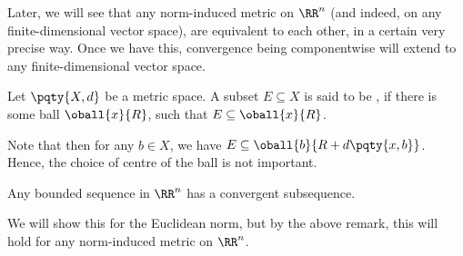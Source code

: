\begin{remark}
    Later, we will see that any norm-induced metric on \(\RR^n\) (and indeed, on any finite-dimensional vector space), are equivalent to each other, in a certain very precise way. Once we have this, convergence being componentwise will extend to any finite-dimensional vector space.
\end{remark}

\begin{definition}
    Let \(\pqty{X, d}\) be a metric space. A subset \(E \subseteq X\) is said to be , if there is some ball \(\oball{x}{R}\), such that \(E \subseteq \oball{x}{R}\).
\end{definition}

\begin{remark}
    Note that then for any \(b \in X\), we have \(E \subseteq \oball{b}{R + d\pqty{x, b}}\). Hence, the choice of centre of the ball is not important.
\end{remark}

\begin{theorem}
    \label{thm:bolzano-weierstrass}%
    Any bounded sequence in \(\RR^n\) has a convergent subsequence.
\end{theorem}

\begin{remark}
    We will show this for the Euclidean norm, but by the above remark, this will hold for any norm-induced metric on \(\RR^n\).
\end{remark}

